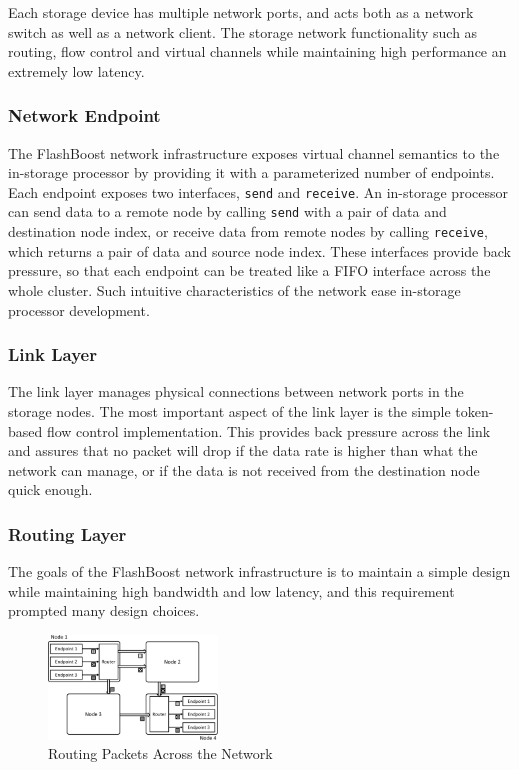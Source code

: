 Each storage device has multiple network ports, and
acts both as a network switch as well as a network client. The storage network
functionality such as routing, flow control and virtual channels while
maintaining high performance an extremely low latency.

\subsubsection{Network Endpoint}

The FlashBoost network infrastructure exposes virtual channel semantics to the
in-storage processor by providing it with a parameterized number of endpoints. Each endpoint
exposes two interfaces, \texttt{send} and \texttt{receive}. An in-storage
processor can send data to a remote node by calling \texttt{send} with a pair of
data and destination node index, or receive data from remote nodes by calling
\texttt{receive}, which returns a pair of data and source node index. These
interfaces provide back pressure, so that each endpoint can be treated like a FIFO
interface across the whole cluster. Such intuitive characteristics of the
network ease in-storage processor development.

\subsubsection{Link Layer}

The link layer manages physical connections between network ports in the storage
nodes. The most important aspect of the link layer is the simple token-based
flow control implementation. This provides back pressure across the link and
assures that no packet will drop if the data rate is higher than what the
network can manage, or if the data is not received from the destination node
quick enough.

\subsubsection{Routing Layer}

The goals of the FlashBoost network infrastructure is to maintain a simple
design while maintaining high bandwidth and low latency, and this requirement
prompted many design choices.

\begin{figure}[h]
	\begin{center}
	\includegraphics[width=0.4\textwidth]{figures/routing-crop.pdf}
	\caption{Routing Packets Across the Network}
	\label{fig:networkrouting}
	\end{center}
\end{figure}



